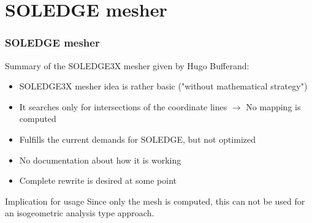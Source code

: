 \documentclass[t,10pt,a3paper]{beamer} %
\begin{document}
\section{SOLEDGE mesher}
	\begin{frame} %
	\frametitle{\color{vert}\textbf{SOLEDGE mesher}}

	Summary of the SOLEDGE3X mesher given by Hugo Bufferand:
	\begin{itemize}
		\item SOLEDGE3X mesher idea is rather basic ("without mathematical strategy")
		\item It searches only for intersections of the coordinate lines 
				$\rightarrow$ No mapping is computed
		\item Fulfills the current demands for SOLEDGE, but not optimized
		\item No documentation about how it is working
		\item Complete rewrite is desired at some point
	\end{itemize}

	\begin{alertblock}{\large{Implication for usage}}
		Since only the mesh is computed, this can not be used for an
		isogeometric analysis type approach.
	\end{alertblock}


\end{frame}
\end{document}
